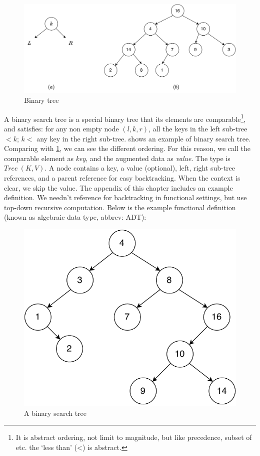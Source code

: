 \documentclass[b5paper]{article}
\begin{document}
\begin{figure}[htbp]
  \centering
  \includegraphics[scale=0.5]{img/binary-tree}
  \caption{Binary tree}
  \label{fig:binary-tree-example}
\end{figure}

A binary search tree is a special binary tree that its elements are comparable\footnote{It is abstract ordering, not limit to magnitude, but like precedence, subset of etc. the `less than' (<) is abstract.}, and satisfies: for any non empty node $(l, k, r)$, all the keys in the left sub-tree $< k$; $k <$ any key in the right sub-tree.  shows an example of binary search tree. Comparing with \cref{fig:binary-tree-example}, we can see the different ordering. For this reason, we call the comparable element as {\em key}, and the augmented data as {\em value}. The type is $Tree\ (K, V)$. A node contains a key, a value (optional), left, right sub-tree references, and a parent reference for easy backtracking. When the context is clear, we skip the value. The appendix of this chapter includes an example definition. We needn't reference for backtracking in functional settings, but use top-down recursive computation. Below is the example functional definition (known as algebraic data type, abbrev: ADT):

\begin{figure}[htbp]
  \begin{center}
   \includegraphics[scale=0.5]{img/bst-example}
   \caption{A binary search tree} \label{fig:bst-example}
  \end{center}
\end{figure}
\end{document}
